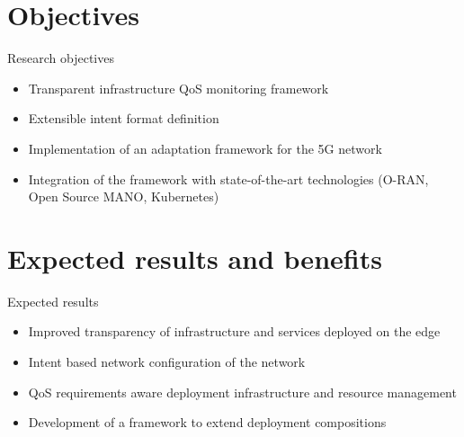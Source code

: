\documentclass[xcolor={usenames,dvipsnames,svgnames}]{beamer}
\begin{document}

\section{Objectives}

\begin{frame}{Research objectives}
	\begin{itemize}
		\setlength\itemsep{1em}
		\item Transparent infrastructure \gls{QoS} monitoring framework
		\item Extensible intent format definition
		\item Implementation of an adaptation framework for the 5G network
		\item Integration of the framework with state-of-the-art technologies (O-RAN, Open Source MANO, Kubernetes)
	\end{itemize}
\end{frame}

\section{Expected results and benefits}

\begin{frame}{Expected results}
	\begin{itemize}
		\setlength\itemsep{1em}
		\item Improved transparency of infrastructure and services deployed on the edge
		\item Intent based network configuration of the network
		\item \gls{QoS} requirements aware deployment infrastructure and resource management
		\item Development of a framework to extend deployment compositions
	\end{itemize}
\end{frame}
\end{document}
